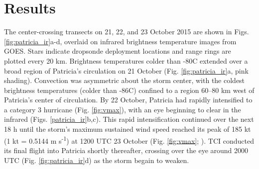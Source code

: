 \section{Results}

The center-crossing transects on 21, 22, and 23 October 2015 are shown in Figs. \ref{fig:patricia_ir}a-d, overlaid on infrared brightness temperature images from GOES.
Stars indicate dropsonde deployment locations and range rings are plotted every 20 km.
Brightness temperatures colder than -80\textdegree{}C extended over a broad region of Patricia’s circulation on 21 October (Fig. \ref{fig:patricia_ir}a, pink shading).
Convection was asymmetric about the storm center, with the coldest brightness temperatures (colder than -86\textdegree{}C) confined to a region 60–80 km west of Patricia’s center of circulation.
By 22 October, Patricia had rapidly intensified to a category 3 hurricane (Fig. \ref{fig:vmax}), with an eye beginning to clear in the infrared (Figs. \ref{patricia_ir}b,c).
This rapid intensification continued over the next 18 h until the storm’s maximum sustained wind speed reached its peak
of 185 kt (1 kt = 0.5144 m s\textsuperscript{-1}) at 1200 UTC 23 October (Fig. \ref{fig:vmax}; \citeauthor{Kimberlainetal2016} \citeyear{Kimberlainetal2016}).
TCI conducted its final flight into Patricia shortly thereafter, crossing over the eye around 2000 UTC (Fig. \ref{fig:patricia_ir}d) as the storm begain to weaken.





